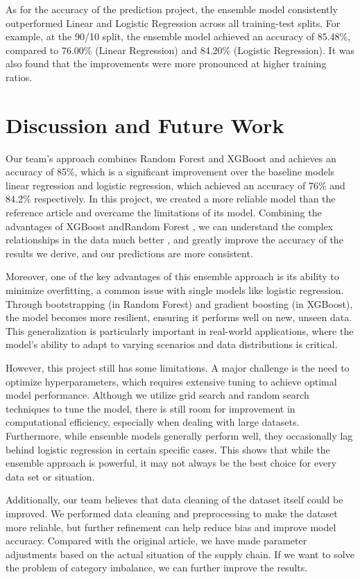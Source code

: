 \documentclass[conference]{IEEEtran}
\begin{document}
As for the accuracy of the prediction project,  the ensemble model consistently outperformed Linear and Logistic Regression across all training-test splits. For example, at the 90/10 split, the ensemble model achieved an accuracy of 85.48\%, compared to 76.00\% (Linear Regression) and 84.20\% (Logistic Regression). It was also found that the improvements were more pronounced at higher training ratios.

\section{Discussion and Future Work}
Our team’s approach combines Random Forest and XGBoost and achieves an accuracy of 85\%, which is a significant improvement over the baseline models linear regression and logistic regression, which achieved an accuracy of 76\% and 84.2\% respectively. In this project, we created a more reliable model than the reference article and overcame the limitations of its model. Combining the advantages of XGBoost andRandom Forest , we can understand the complex relationships in the data much better , and greatly improve the accuracy of the results we derive, and our predictions are more consistent.

Moreover, one of the key advantages of this ensemble approach is its ability to minimize overfitting, a common issue with single models like logistic regression. Through bootstrapping (in Random Forest) and gradient boosting (in XGBoost), the model becomes more resilient, ensuring it performs well on new, unseen data. This generalization is particularly important in real-world applications, where the model's ability to adapt to varying scenarios and data distributions is critical.

However, this project still has some limitations. A major challenge is the need to optimize hyperparameters, which requires extensive tuning to achieve optimal model performance. Although we utilize grid search and random search techniques to tune the model, there is still room for improvement in computational efficiency, especially when dealing with large datasets. Furthermore, while ensemble models generally perform well, they occasionally lag behind logistic regression in certain specific cases. This shows that while the ensemble approach is powerful, it may not always be the best choice for every data set or situation. 

Additionally, our team believes that data cleaning of the dataset itself could be improved. We performed data cleaning and preprocessing to make the dataset more reliable, but further refinement can help reduce bias and improve model accuracy. Compared with the original article, we have made parameter adjustments based on the actual situation of the supply chain. If we want to solve the problem of category imbalance, we can further improve the results. 
\end{document}

